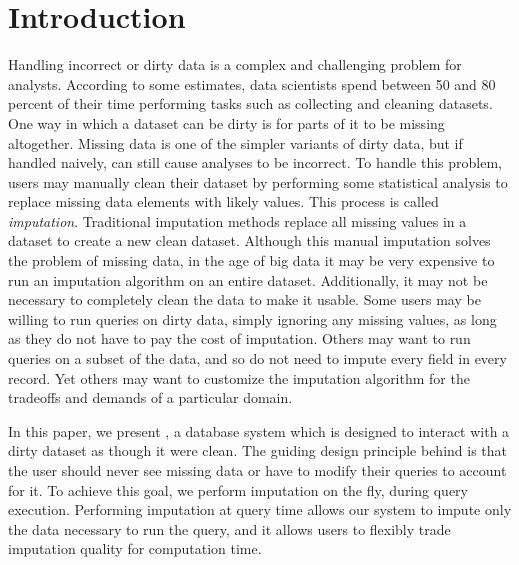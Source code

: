 \section{Introduction}

Handling incorrect or dirty data is a complex and challenging problem for analysts.
According to some estimates, data scientists spend between 50 and 80 percent of their
time performing tasks such as collecting and cleaning datasets\cite{data-science-cleaning}.
One way in which a dataset can be dirty is for parts of it to be missing altogether.
Missing data is one of the simpler variants of dirty data, but if handled naively, can still cause analyses to be incorrect.
To handle this problem, users may manually clean their dataset by performing
some statistical analysis to replace missing data elements with likely values.
This process is called \emph{imputation}.
Traditional imputation methods replace all missing values in a dataset to create a new clean dataset.
Although this manual imputation solves the problem of missing data, in the age of big data it may be very expensive to run an imputation algorithm on an entire dataset.
Additionally, it may not be necessary to completely clean the data to make it usable.
Some users may be willing to run queries on dirty data, simply ignoring any missing values, as long as they do not have to pay the cost of imputation.
Others may want to run queries on a subset of the data, and so do not need to impute
every field in every record. Yet others may want to customize the 
imputation algorithm for the tradeoffs and demands of a particular domain.

In this paper, we present \ProjectName{}, a database system which is designed to interact with a dirty dataset as though it were clean.
The guiding design principle behind \ProjectName{} is that the user should never see missing data or have to modify their queries to account for it.
To achieve this goal, we perform imputation on the fly, during query execution.
Performing imputation at query time allows our system to impute only the data necessary to run the query, and it allows users to flexibly trade imputation quality for computation time.

